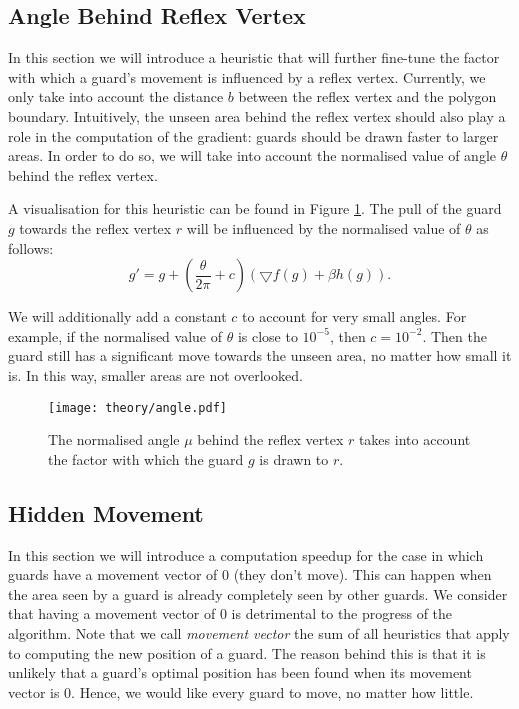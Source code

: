 \subsection{Angle Behind Reflex Vertex}
\label{sec:angle}
In this section we will introduce a heuristic that will further fine-tune the factor with which a guard's movement is influenced by a reflex vertex. Currently, we only take into account the distance $b$ between the reflex vertex and the polygon boundary. Intuitively, the unseen area behind the reflex vertex should also play a role in the computation of the gradient: guards should be drawn faster to larger areas. In order to do so, we will take into account the normalised value of angle $\theta$ behind the reflex vertex.

A visualisation for this heuristic can be found in Figure \ref{fig:angle}. The pull of the guard $g$ towards the reflex vertex $r$ will be influenced by the normalised value of $\theta$ as follows: $$g' = g + (\frac{\theta}{2\pi} + c)(\bigtriangledown f(g) + \beta h(g)).$$

We will additionally add a constant $c$ to account for very small angles. For example, if the normalised value of $\theta$ is close to $10^{-5}$, then $c = 10^{-2}$. Then the guard still has a significant move towards the unseen area, no matter how small it is. In this way, smaller areas are not overlooked.

\begin{figure}[h!]
    \centering
    \texttt{[image: theory/angle.pdf]}
    \caption{The normalised angle $\mu$ behind the reflex vertex $r$ takes into account the factor with which the guard $g$ is drawn to $r$.}
    \label{fig:angle}
\end{figure}

\subsection{Hidden Movement}
\label{sec:hidden_gradient}
In this section we will introduce a computation speedup for the case in which guards have a movement vector of 0 (they don't move). This can happen when the area seen by a guard is already completely seen by other guards. We consider that having a movement vector of 0 is detrimental to the progress of the algorithm. Note that we call \textit{movement vector} the sum of all heuristics that apply to computing the new position of a guard. The reason behind this is that it is unlikely that a guard's optimal position has been found when its movement vector is 0. Hence, we would like every guard to move, no matter how little.

